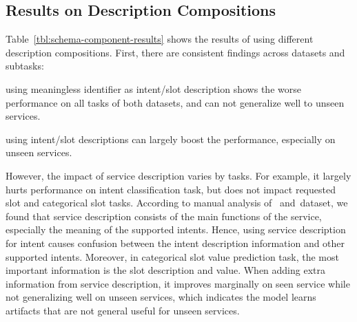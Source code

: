 \subsection{Results on Description Compositions}
\label{ssec:sgd:com-results}
Table~\ref{tbl:schema-component-results} shows the results of using
different description compositions. First, there are consistent
findings across datasets and subtasks:
\begin{inparaenum}[(1)]
 \item using meaningless identifier as intent/slot description shows
  the worse performance on all tasks of both datasets, and can
  not generalize well to unseen services.
 \item using intent/slot descriptions can largely boost the performance,
  especially on unseen services.
\end{inparaenum}

However, the impact of service description varies by tasks. For
example, it largely hurts performance on intent classification task,
but does not impact %
requested slot and categorical slot tasks. According to manual
analysis of \sgdst~and~\multiwoz dataset, we found that service
description consists of the main functions of the service, especially
the meaning of the supported intents. Hence, using service description
for intent causes confusion between the intent description information
and other supported intents. Moreover, in categorical slot value
prediction task, the most important information is the slot
description and value.  When adding extra information from service
description, it improves marginally on seen service while not
generalizing well on unseen services, which indicates the model learns
artifacts that are not general useful for unseen services.

